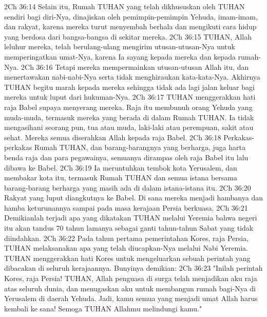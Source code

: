 2Ch 36:14  Selain itu, Rumah TUHAN yang telah dikhususkan oleh TUHAN sendiri bagi diri-Nya, dinajiskan oleh pemimpin-pemimpin Yehuda, imam-imam, dan rakyat, karena mereka turut menyembah berhala dan mengikuti cara hidup yang berdosa dari bangsa-bangsa di sekitar mereka.
2Ch 36:15  TUHAN, Allah leluhur mereka, telah berulang-ulang mengirim utusan-utusan-Nya untuk memperingatkan umat-Nya, karena Ia sayang kepada mereka dan kepada rumah-Nya.
2Ch 36:16  Tetapi mereka mempermainkan utusan-utusan Allah itu, dan menertawakan nabi-nabi-Nya serta tidak menghiraukan kata-kata-Nya. Akhirnya TUHAN begitu marah kepada mereka sehingga tidak ada lagi jalan keluar bagi mereka untuk luput dari hukuman-Nya.
2Ch 36:17  TUHAN menggerakkan hati raja Babel supaya menyerang mereka. Raja itu membunuh orang Yehuda yang muda-muda, termasuk mereka yang berada di dalam Rumah TUHAN. Ia tidak mengasihani seorang pun, tua atau muda, laki-laki atau perempuan, sakit atau sehat. Mereka semua diserahkan Allah kepada raja Babel.
2Ch 36:18  Perkakas-perkakas Rumah TUHAN, dan barang-barangnya yang berharga, juga harta benda raja dan para pegawainya, semuanya dirampas oleh raja Babel itu lalu dibawa ke Babel.
2Ch 36:19  Ia meruntuhkan tembok kota Yerusalem, dan membakar kota itu, termasuk Rumah TUHAN dan semua istana bersama barang-barang berharga yang masih ada di dalam istana-istana itu.
2Ch 36:20  Rakyat yang luput diangkutnya ke Babel. Di sana mereka menjadi hambanya dan hamba keturunannya sampai pada masa kerajaan Persia berkuasa.
2Ch 36:21  Demikianlah terjadi apa yang dikatakan TUHAN melalui Yeremia bahwa negeri itu akan tandus 70 tahun lamanya sebagai ganti tahun-tahun Sabat yang tidak diindahkan.
2Ch 36:22  Pada tahun pertama pemerintahan Kores, raja Persia, TUHAN melaksanakan apa yang telah diucapkan-Nya melalui Nabi Yeremia. TUHAN menggerakkan hati Kores untuk mengeluarkan sebuah perintah yang dibacakan di seluruh kerajaannya. Bunyinya demikian:
2Ch 36:23  "Inilah perintah Kores, raja Persia! TUHAN, Allah penguasa di surga telah menjadikan aku raja atas seluruh dunia, dan menugaskan aku untuk membangun rumah bagi-Nya di Yerusalem di daerah Yehuda. Jadi, kamu semua yang menjadi umat Allah harus kembali ke sana! Semoga TUHAN Allahmu melindungi kamu."


